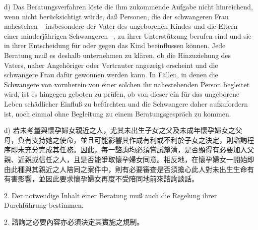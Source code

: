 \documentclass[12pt]{article}
\begin{document}
\begin{sourcepara}[title={原文D.119}]
d) Das Beratungsverfahren löste die ihm zukommende Aufgabe nicht hinreichend, wenn nicht berücksichtigt würde, daß Personen, die der schwangeren Frau nahestehen -- insbesondere der Vater des ungeborenen Kindes und die Eltern einer minderjährigen Schwangeren --, zu ihrer Unterstützung berufen sind und sie in ihrer Entscheidung für oder gegen das Kind beeinflussen können. Jede Beratung muß es deshalb unternehmen zu klären, ob die Hinzuziehung des Vaters, naher Angehöriger oder Vertrauter angezeigt erscheint und die schwangere Frau dafür gewonnen werden kann. In Fällen, in denen die Schwangere von vornherein von einer solchen ihr nahestehenden Person begleitet wird, ist es hingegen geboten zu prüfen, ob von dieser ein für das ungeborene Leben schädlicher Einfluß zu befürchten und die Schwangere daher aufzufordern ist, noch einmal ohne Begleitung zu einem Beratungsgespräch zu kommen.
\end{sourcepara}
\begin{transpara}
d) 若未考量與懷孕婦女親近之人，尤其未出生子女之父及未成年懷孕婦女之父母，負有支持她之使命，並且可能影響其作成有利或不利於子女之決定，則諮詢程序即未充分完成其任務。因此，每一諮詢均必須嘗試釐清，是否顯得有必要加入父親、近親或信任之人，且是否能爭取懷孕婦女同意。相反地，在懷孕婦女一開始即由此種與其親近之人陪同之案件中，則有必要審查是否須擔心此人對未出生生命有有害影響，並因此要求懷孕婦女再度不受陪同地前來諮詢談話。
\end{transpara}

\begin{sourcepara}[title={原文D.120}]
2. Der notwendige Inhalt einer Beratung muß auch die Regelung ihrer Durchführung bestimmen.
\end{sourcepara}
\begin{transpara}
2. 諮詢之必要內容亦必須決定其實施之規制。
\end{transpara}
\end{document}
